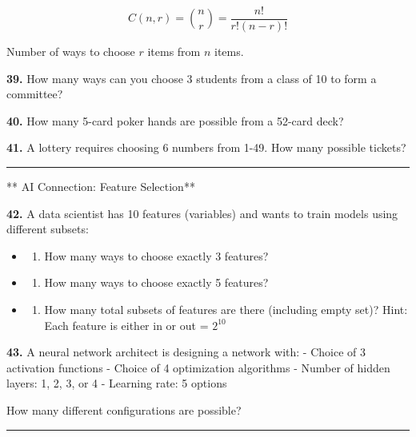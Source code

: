\documentclass[
  11pt,
]{article}
\providecommand{\tightlist}{%
  \setlength{\itemsep}{0pt}\setlength{\parskip}{0pt}}
\begin{document}
\[C(n, r) = \binom{n}{r} = \frac{n!}{r!(n-r)!}\]

Number of ways to choose \(r\) items from \(n\) items.

\textbf{39.} How many ways can you choose 3 students from a class of 10
to form a committee?

\textbf{40.} How many 5-card poker hands are possible from a 52-card
deck?

\textbf{41.} A lottery requires choosing 6 numbers from 1-49. How many
possible tickets?

\begin{center}\rule{0.5\linewidth}{0.5pt}\end{center}

** AI Connection: Feature Selection**

\textbf{42.} A data scientist has 10 features (variables) and wants to
train models using different subsets:

\begin{itemize}
\item
  \begin{enumerate}
  \def\labelenumi{(\alph{enumi})}
  \tightlist
  \item
    How many ways to choose exactly 3 features?
  \end{enumerate}
\item
  \begin{enumerate}
  \def\labelenumi{(\alph{enumi})}
  \setcounter{enumi}{1}
  \tightlist
  \item
    How many ways to choose exactly 5 features?
  \end{enumerate}
\item
  \begin{enumerate}
  \def\labelenumi{(\alph{enumi})}
  \setcounter{enumi}{2}
  \tightlist
  \item
    How many total subsets of features are there (including empty set)?
    Hint: Each feature is either in or out = \(2^{10}\)
  \end{enumerate}
\end{itemize}

\textbf{43.} A neural network architect is designing a network with: -
Choice of 3 activation functions - Choice of 4 optimization algorithms -
Number of hidden layers: 1, 2, 3, or 4 - Learning rate: 5 options

How many different configurations are possible?

\begin{center}\rule{0.5\linewidth}{0.5pt}\end{center}
\end{document}
